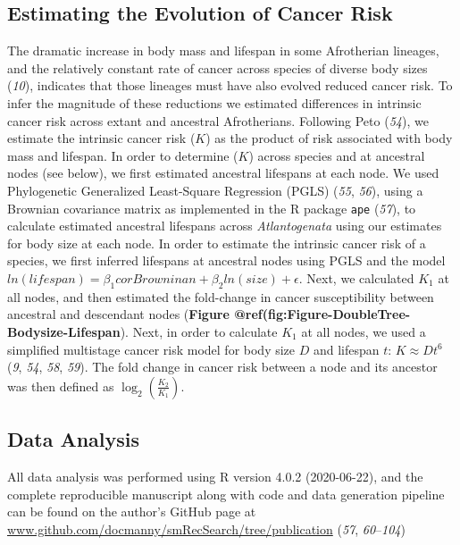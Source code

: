 \documentclass[]{elsarticle} %
\begin{document}
\hypertarget{estimating-the-evolution-of-cancer-risk}{%
\subsection{Estimating the Evolution of Cancer Risk}\label{estimating-the-evolution-of-cancer-risk}}

The dramatic increase in body mass and lifespan in some Afrotherian lineages, and the relatively constant rate of cancer across species of diverse body sizes (\emph{10}), indicates that those lineages must have also evolved reduced cancer risk. To infer the magnitude of these reductions we estimated differences in intrinsic cancer risk across extant and ancestral Afrotherians. Following Peto (\emph{54}), we estimate the intrinsic cancer risk (\(K\)) as the product of risk associated with body mass and lifespan. In order to determine (\(K\)) across species and at ancestral nodes (see below), we first estimated ancestral lifespans at each node. We used Phylogenetic Generalized Least-Square Regression (PGLS) (\emph{55}, \emph{56}), using a Brownian covariance matrix as implemented in the R package \texttt{ape} (\emph{57}), to calculate estimated ancestral lifespans across \emph{Atlantogenata} using our estimates for body size at each node. In order to estimate the intrinsic cancer risk of a species, we first inferred lifespans at ancestral nodes using PGLS and the model \(ln(lifespan) = \beta_{1}corBrowninan + \beta_{2}ln(size) + \epsilon\). Next, we calculated \(K_{1}\) at all nodes, and then estimated the fold-change in cancer susceptibility between ancestral and descendant nodes (\textbf{Figure @ref(fig:Figure-DoubleTree-Bodysize-Lifespan}). Next, in order to calculate \(K_{1}\) at all nodes, we used a simplified multistage cancer risk model for body size \(D\) and lifespan \(t\): \(K \approx Dt^6\) (\emph{9}, \emph{54}, \emph{58}, \emph{59}). The fold change in cancer risk between a node and its ancestor was then defined as \(\log_{2}(\frac{K_{2}}{K_{1}})\).

\hypertarget{data-analysis}{%
\subsection{Data Analysis}\label{data-analysis}}

All data analysis was performed using R version 4.0.2 (2020-06-22), and the complete reproducible manuscript along with code and data generation pipeline can be found on the author's GitHub page at \url{www.github.com/docmanny/smRecSearch/tree/publication} (\emph{57}, \emph{60}--\emph{104})
\end{document}
